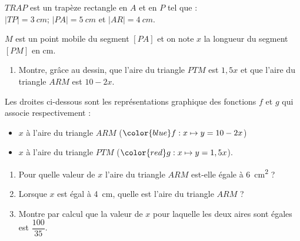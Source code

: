 %
%
    \begin{center}
        
    \end{center}

    $TRAP$ est un trapèze rectangle en $A$ et en $P$ tel que :\\
    $|TP| = \SI{3}{cm}$; $|PA| = \SI{5}{cm}$ et $|AR|=\SI{4}{cm}$.

    $M$ est un point mobile du segment $[PA]$ et on note $x$ la longueur du segment $[PM]$ en cm.

    \begin{enumerate}[series=mine]
        \item Montre, grâce au dessin, que l'aire du triangle $PTM$ est $1,5x$ et que l'aire du triangle $ARM$ est $10-2x$.
    \end{enumerate}

    Les droites ci-dessous sont les représentations graphique des fonctions $f$ et $g$ qui associe respectivement :
    \begin{itemize}
        \item $x$ à l'aire du triangle $ARM$ ($\color{blue}f:x\mapsto y= 10-2x$)
        \item $x$ à l'aire du triangle $PTM$ ($\color{red}g:x\mapsto y=1,5x$).
    \end{itemize}

    

    \begin{enumerate}[resume=mine]
        \item Pour quelle valeur de $x$ l'aire du triangle $ARM$ est-elle égale à \SI{6}{cm^2} ?
        \item Lorsque $x$ est égal à \SI{4}{cm}, quelle est l'aire du triangle $ARM$ ?
        \item Montre par calcul que la valeur de $x$ pour laquelle les deux aires sont égales est $\dfrac{100}{35}$.
    \end{enumerate}
